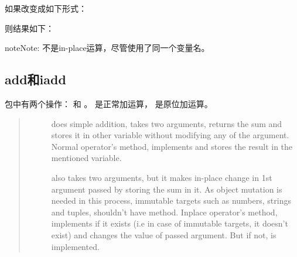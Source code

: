 \documentclass[letterpaper,10pt,english]{sphinxmanual}
\begin{document}
如果改变成如下形式：

%
\begin{sphinxVerbatim}[commandchars=\\\{\},numbers=left,firstnumber=1,stepnumber=1]
  \PYG{p}{[}\PYG{p}{]}
  
    \PYG{p}{[}\PYG{p}{]}
\end{sphinxVerbatim}

则结果如下：

%
\begin{sphinxVerbatim}[commandchars=\\\{\}]
 
 
\end{sphinxVerbatim}

\begin{sphinxadmonition}{note}{Note:}
 不是in-place运算，尽管使用了同一个变量名。
\end{sphinxadmonition}


\subsection{add和iadd}
\label{\detokenize{python/01_inplace:addiadd}}
 包中有两个操作： 和  。 是正常加运算，  是原位加运算。
\begin{quote}
\begin{description}
\item[{}] \leavevmode
does simple addition, takes two arguments, returns the sum and stores it in other variable without modifying any of the argument.
Normal operator’s  method, implements  and stores the result in the mentioned variable.

\item[{}] \leavevmode
also takes two arguments, but it makes in-place change in 1st argument passed by storing the sum in it. As object mutation is needed in this process, immutable targets such as numbers, strings and tuples, shouldn’t have  method.
Inplace operator’s  method, implements  if it exists (i.e in case of immutable targets, it doesn’t exist) and changes the value of passed argument. But if not,  is implemented.

\end{description}
\end{quote}
\end{document}
